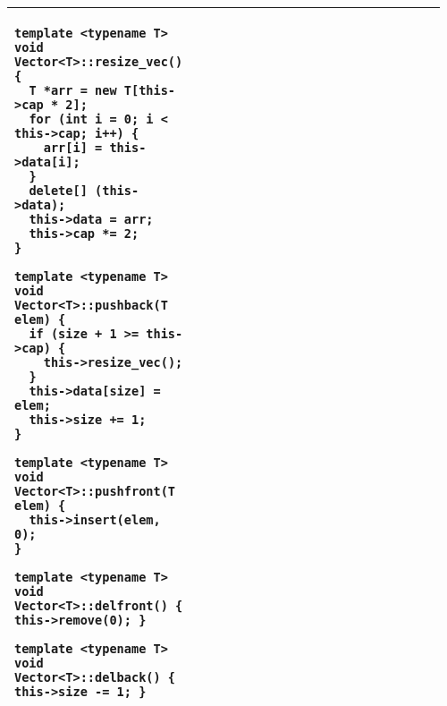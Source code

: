 \documentclass[main.tex,fontsize=8pt,paper=a4,paper=portrait,DIV=calc]{scrartcl}
\begin{document}
\begin{table}[ht!]
\begin{tabular}{|m{0.2\linewidth}|m{0.755\linewidth}|}
\begin{lstlisting}
template <typename T> void Vector<T>::resize_vec() {
  T *arr = new T[this->cap * 2];
  for (int i = 0; i < this->cap; i++) {
    arr[i] = this->data[i];
  }
  delete[] (this->data);
  this->data = arr;
  this->cap *= 2;
}

template <typename T> void Vector<T>::pushback(T elem) {
  if (size + 1 >= this->cap) {
    this->resize_vec();
  }
  this->data[size] = elem;
  this->size += 1;
}

template <typename T> void Vector<T>::pushfront(T elem) {
  this->insert(elem, 0);
}

template <typename T> void Vector<T>::delfront() { this->remove(0); }

template <typename T> void Vector<T>::delback() { this->size -= 1; }
\end{lstlisting}
\\
\hline
\end{tabular}
\end{table}
\pagebreak
\end{document}
